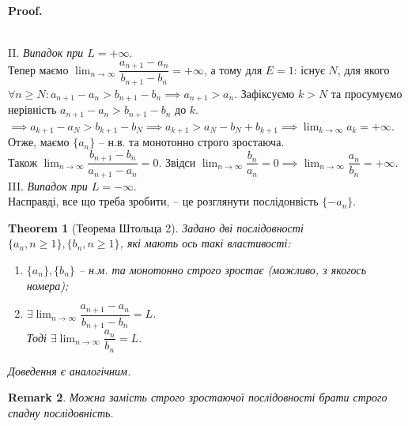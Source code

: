 \documentclass[a4paper, 14pt]{article}
\makeatletter
\def\qed{$\blacksquare$}
\theoremstyle{theoremdd}
\newtheorem{theorem}{Theorem}[subsection]
\theoremstyle{theoremdd}
\theoremstyle{theoremdd}
\theoremstyle{theoremdd}
\theoremstyle{theoremdd}
\theoremstyle{theoremdd}
\newtheorem{remark}[theorem]{Remark}
\theoremstyle{theoremdd}
\theoremstyle{theoremdd}
\renewenvironment{proof}[1][Proof.\\]{\par
\pushQED{\hfill \qed}%
\normalfont \topsep6\p@\@plus6\p@\relax
\trivlist
\item\relax
{\bfseries
#1\@addpunct{.}}\hspace\labelsep\ignorespaces
}{%
\popQED\endtrivlist\@endpefalse
}
\makeatother
\begin{document}
\begin{proof}
	\bigskip \\
	II. \textit{Випадок при $L = +\infty$}. \\
	Тепер маємо $\displaystyle \lim_{n \to \infty} \dfrac{a_{n+1} - a_n}{b_{n+1} - b_n} = + \infty$, а тому для $E = 1$: існує $N$, для якого $\forall n \geq N: a_{n+1} - a_n > b_{n+1} - b_n \implies a_{n+1} > a_n$. Зафіксуємо $k > N$ та просумуємо нерівність $a_{n+1} - a_n > b_{n+1} - b_n$ до $k$.\\
	$\implies a_{k+1} - a_N > b_{k+1} - b_N \implies a_{k+1} > a_N-b_N + b_{k+1} \implies \displaystyle\lim_{k \to \infty} a_k = +\infty$.\\
	Отже, маємо $\{a_n\}$ -- н.в. та монотонно строго зростаюча.\\
	Також $\displaystyle \lim_{n \to \infty} \dfrac{b_{n+1} - b_n}{a_{n+1} - a_n} = 0$.
	Звідси $\displaystyle \lim_{n \to \infty} \dfrac{b_n}{a_n} = 0 \implies \lim_{n \to \infty} \dfrac{a_n}{b_n} = + \infty$.
	\bigskip \\
	III. \textit{Випадок при $L = -\infty$}.\\
	Насправді, все що треба зробити, -- це розглянути послідонвість $\{-a_n\}$.
	\end{proof}
	
	\begin{theorem}[Теорема Штольца 2]
	Задано дві послідовності $\{a_n, n \geq 1\}, \{b_n, n \geq 1\}$, які мають ось такі властивості:
	\begin{enumerate}[nosep,wide=0pt,label={\arabic*)}]
	\item $\{a_n\}, \{b_n\}$ -- н.м. та монотонно строго зростає (можливо, з якогось номера);
	\item $\exists \displaystyle \lim_{n \to \infty} \dfrac{a_{n+1} - a_n}{b_{n+1} - b_n} = L$.\\
	Тоді $\exists \displaystyle \lim_{n \to \infty} \dfrac{a_n}{b_n} = L$.
	\end{enumerate}
	\textit{Доведення є аналогічним.}
	\end{theorem}
	
	\begin{remark}
	Можна замість строго зростаючої послідовності брати строго спадну послідовність.
	\end{remark}
	
\end{document}
